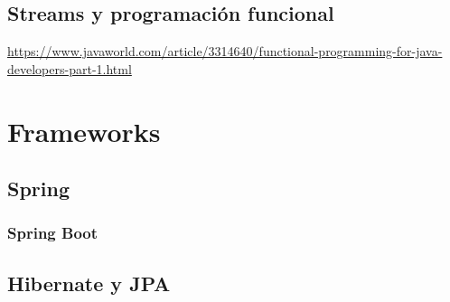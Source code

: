 \documentclass[11pt]{article}
\begin{document}
\subsection{Streams y programación funcional}
\label{sec:org266b8f6}
\url{https://www.javaworld.com/article/3314640/functional-programming-for-java-developers-part-1.html}
\section{Frameworks}
\label{sec:org744156a}
\subsection{Spring}
\label{sec:orgb5cad19}
\subsubsection{Spring Boot}
\label{sec:org05ae06d}
\subsection{Hibernate y JPA}
\label{sec:org4d5b98c}
\end{document}
